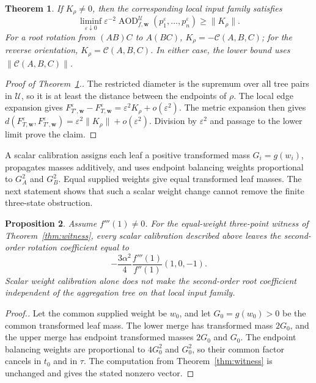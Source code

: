 \documentclass[11pt]{article}
\theoremstyle{plain}
\newtheorem{theorem}{Theorem}
\newtheorem{proposition}[theorem]{Proposition}
\theoremstyle{definition}
\theoremstyle{definition}
\newcommand{\AOD}{\operatorname{AOD}}
\newcommand{\eps}{\varepsilon}
\newcommand{\Curv}{\mathcal C}
\newcommand{\wv}{\mathbf w}
\newcommand{\Fw}[1]{F_{#1,\wv}^{\eps}}
\newcommand{\AODfw}{\AOD_{f,\wv}}
\begin{document}
\begin{theorem}\label{thm:lower}
If $K_\rho\ne0$, then the corresponding local input family satisfies
\[
\liminf_{\eps\downarrow0}\eps^{-2}\AODfw^{\mathcal U}(p_1^\eps,\ldots,p_n^\eps)
\ge \|K_\rho\|.
\]
For a root rotation from $(AB)C$ to $A(BC)$, $K_\rho=-\Curv(A,B,C)$; for the reverse orientation, $K_\rho=\Curv(A,B,C)$. In either case, the lower bound uses $\|\Curv(A,B,C)\|$.
\end{theorem}

\begin{proof}[Proof of Theorem~\ref{thm:lower}.]
The restricted diameter is the supremum over all tree pairs in $\mathcal U$, so it is at least the distance between the endpoints of $\rho$. The local edge expansion gives $\Fw{T'}-\Fw{T}=\eps^2K_\rho+o(\eps^2)$. The metric expansion then gives $d(\Fw{T},\Fw{T'})=\eps^2\|K_\rho\|+o(\eps^2)$. Division by $\eps^2$ and passage to the lower limit prove the claim.
\end{proof}

A scalar calibration assigns each leaf a positive transformed mass $G_i=g(w_i)$, propagates masses additively, and uses endpoint balancing weights proportional to $G_A^2$ and $G_B^2$. Equal supplied weights give equal transformed leaf masses. The next statement shows that such a scalar weight change cannot remove the finite three-state obstruction.

\begin{proposition}\label{prop:scalar}
Assume $f'''(1)\ne0$. For the equal-weight three-point witness of Theorem~\ref{thm:witness}, every scalar calibration described above leaves the second-order rotation coefficient equal to
\[
-\frac{3\alpha^2}{4}\frac{f'''(1)}{f''(1)}(1,0,-1).
\]
Scalar weight calibration alone does not make the second-order root coefficient independent of the aggregation tree on that local input family.
\end{proposition}

\begin{proof}[Proof.]
Let the common supplied weight be $w_0$, and let $G_0=g(w_0)>0$ be the common transformed leaf mass. The lower merge has transformed mass $2G_0$, and the upper merge has endpoint transformed masses $2G_0$ and $G_0$. The endpoint balancing weights are proportional to $4G_0^2$ and $G_0^2$, so their common factor cancels in $t_0$ and in $\tau$. The computation from Theorem~\ref{thm:witness} is unchanged and gives the stated nonzero vector.
\end{proof}
\end{document}

